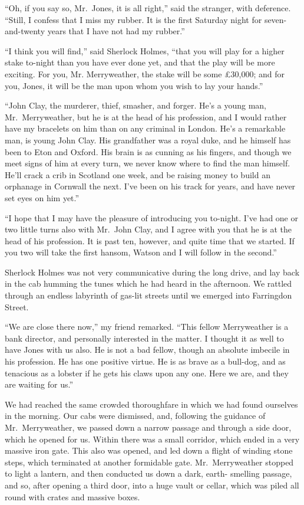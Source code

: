 “Oh, if you say so, Mr.~Jones, it is all right,” said the
stranger, with deference. “Still, I confess that I miss my
rubber. It is the first Saturday night for seven-and-twenty
years that I have not had my rubber.”

“I think you will find,” said Sherlock Holmes, “that you
will play for a higher stake to-night than you have ever done
yet, and that the play will be more exciting. For you, Mr.
Merryweather, the stake will be some £30,000; and for you,
Jones, it will be the man upon whom you wish to lay your
hands.”

“John Clay, the murderer, thief, smasher, and forger. He’s
a young man, Mr.~Merryweather, but he is at the head of his
profession, and I would rather have my bracelets on him than
on any criminal in London. He’s a remarkable man, is young
John Clay. His grandfather was a royal duke, and he himself
has been to Eton and Oxford. His brain is as cunning
as his fingers, and though we meet signs of him at every turn,
we never know where to find the man himself. He’ll crack a
crib in Scotland one week, and be raising money to build an
orphanage in Cornwall the next. I’ve been on his track for
years, and have never set eyes on him yet.”

“I hope that I may have the pleasure of introducing you
to-night. I’ve had one or two little turns also with Mr.~John
Clay, and I agree with you that he is at the head of his profession.
It is past ten, however, and quite time that we started.
If you two will take the first hansom, Watson and I will
follow in the second.”

Sherlock Holmes was not very communicative during the
long drive, and lay back in the cab humming the tunes which
he had heard in the afternoon. We rattled through an endless
labyrinth of gas-lit streets until we emerged into
Farringdon Street.

“We are close there now,” my friend remarked. “This fellow
Merryweather is a bank director, and personally interested
in the matter. I thought it as well to have Jones with us
also. He is not a bad fellow, though an absolute imbecile in
his profession. He has one positive virtue. He is as brave
as a bull-dog, and as tenacious as a lobster if he gets his
claws upon any one. Here we are, and they are waiting for
us.”

We had reached the same crowded thoroughfare in which
we had found ourselves in the morning. Our cabs were dismissed,
and, following the guidance of Mr.~Merryweather, we
passed down a narrow passage and through a side door, which
he opened for us. Within there was a small corridor, which
ended in a very massive iron gate. This also was opened,
and led down a flight of winding stone steps, which terminated
at another formidable gate. Mr.~Merryweather stopped
to light a lantern, and then conducted us down a dark, earth-%
smelling passage, and so, after opening a third door, into a
huge vault or cellar, which was piled all round with crates and
massive boxes.


